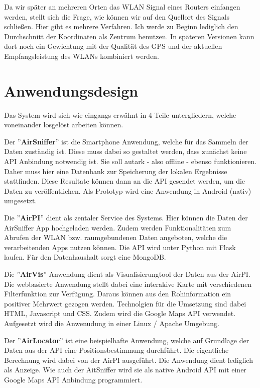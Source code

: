 \documentclass[11pt,a4paper]{article}
\begin{document}
Da wir später an mehreren Orten das WLAN Signal eines Routers einfangen werden, stellt sich die Frage, wie können wir auf den Quellort des Signals schließen. Hier gibt es mehrere Verfahren. Ich werde zu Beginn lediglich den Durchschnitt der Koordinaten als Zentrum benutzen. In späteren Versionen kann dort noch ein Gewichtung mit der Qualität des GPS und der aktuellen Empfangsleistung des WLANs kombiniert werden.

\section{Anwendungsdesign}

Das System wird sich wie eingangs erwähnt in 4 Teile untergliedern, welche voneinander losgelöst arbeiten können.

Der ''\textbf{AirSniffer}'' ist die Smartphone Anwendung, welche für das Sammeln der Daten zuständig ist. Diese muss dabei so gestaltet werden, dass zunächst keine API Anbindung notwendig ist. Sie soll autark - also offline - ebenso funktionieren. Daher muss hier eine Datenbank zur Speicherung der lokalen Ergebnisse stattfinden. Diese Resultate können dann an die API gesendet werden, um die Daten zu veröffentlichen. Als Prototyp wird eine Anwendung in Android (nativ) umgesetzt. 

Die ''\textbf{AirPI}'' dient als zentaler Service des Systems. Hier können die Daten der AirSniffer App hochgeladen werden. Zudem werden Funktionalitäten zum Abrufen der WLAN bzw. raumgebundenen Daten angeboten, welche die verarbeitenden Apps nutzen können. Die API wird unter Python mit Flask laufen. Für den Datenhaushalt sorgt eine MongoDB.

Die ''\textbf{AirVis}'' Anwendung dient als Visualisierungtool der Daten aus der AirPI. Die webbasierte Anwendung stellt dabei eine interakive Karte mit verschiedenen Filterfunktion zur Verfügung. Daraus können aus den Rohinformation ein positiver Mehrwert gezogen werden. Technolgien für die Umsetzung sind dabei HTML, Javascript und CSS. Zudem wird die Google Maps API verwendet. Aufgesetzt wird die Anwenudung in einer Linux / Apache Umgebung.

Der ''\textbf{AirLocator}'' ist eine beispielhafte Anwendung, welche auf Grundlage der Daten aus der API eine Positionsbestimmung durchführt. Die eigentliche Berechnung wird dabei von der AirPI ausgeführt. Die Anwendung dient lediglich als Anzeige. Wie auch der AitSniffer wird sie als native Android API mit einer Google Maps API Anbindung programmiert.
\end{document}
